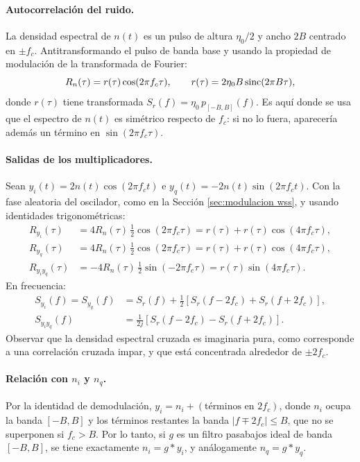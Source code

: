 \paragraph{Autocorrelación del ruido.} La densidad espectral de $n(t)$ es un pulso de altura $\eta_0/2$ y ancho $2B$ centrado en $\pm f_c$. Antitransformando el pulso de banda base y usando la propiedad de modulación de la transformada de Fourier:
\begin{equation*}
    R_n(\tau) = r(\tau)\cos(2\pi f_c\tau), \qquad r(\tau) = 2\eta_0 B\operatorname{sinc}(2\pi B\tau),
\end{equation*}
donde $r(\tau)$ tiene transformada $S_r(f)=\eta_0\, p_{[-B,B]}(f)$. Es aquí donde se usa que el espectro de $n(t)$ es simétrico respecto de $f_c$: si no lo fuera, aparecería además un término en $\sin(2\pi f_c\tau)$.

\paragraph{Salidas de los multiplicadores.} Sean $y_i(t)=2n(t)\cos(2\pi f_c t)$ e $y_q(t)=-2n(t)\sin(2\pi f_c t)$. Con la fase aleatoria del oscilador, como en la Sección \ref{sec:modulacion wss}, y usando identidades trigonométricas:
\begin{align*}
    R_{y_i}(\tau) &= 4R_n(\tau)\,\tfrac{1}{2}\cos(2\pi f_c\tau) = r(\tau) + r(\tau)\cos(4\pi f_c\tau),\\
    R_{y_q}(\tau) &= 4R_n(\tau)\,\tfrac{1}{2}\cos(2\pi f_c\tau) = r(\tau) + r(\tau)\cos(4\pi f_c\tau),\\
    R_{y_iy_q}(\tau) &= -4R_n(\tau)\,\tfrac{1}{2}\sin(-2\pi f_c\tau) = r(\tau)\sin(4\pi f_c\tau).
\end{align*}
En frecuencia:
\begin{align*}
    S_{y_i}(f) = S_{y_q}(f) &= S_r(f) + \tfrac{1}{2}\left[S_r(f-2f_c)+S_r(f+2f_c)\right],\\
    S_{y_iy_q}(f) &= \tfrac{1}{2j}\left[S_r(f-2f_c)-S_r(f+2f_c)\right].
\end{align*}
Observar que la densidad espectral cruzada es imaginaria pura, como corresponde a una correlación cruzada impar, y que está concentrada alrededor de $\pm 2f_c$.

\paragraph{Relación con $n_i$ y $n_q$.} Por la identidad de demodulación, $y_i = n_i + (\text{términos en } 2f_c)$, donde $n_i$ ocupa la banda $[-B,B]$ y los términos restantes la banda $|f\mp 2f_c|\leqslant B$, que no se superponen si $f_c>B$. Por lo tanto, si $g$ es un filtro pasabajos ideal de banda $[-B,B]$, se tiene exactamente $n_i=g*y_i$, y análogamente $n_q=g*y_q$.

